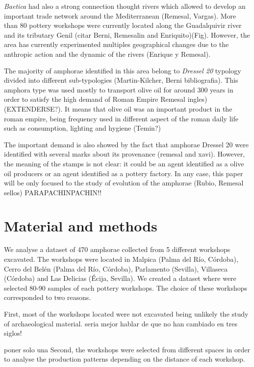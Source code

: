 \documentclass[review, twocolumn]{elsarticle}
\begin{document}
\emph{Baetica} had also a strong connection thought rivers which allowed to develop an important trade network around the Mediterranean (Remesal, Vargas). More than 80 pottery workshops were currently located along the Guadalquivir river and its tributary Genil (citar Berni, Remesalin and Enriquito)(Fig). However, the area has currently experimented multiples geographical changes due to the anthropic action and the dynamic of the rivers (Enrique y Remesal). 

The majority of amphorae identified in this area belong to \emph{Dressel 20} typology divided into different sub-typologies (Martin-Kilcher, Berni bibliografia). This amphora type was used mostly to transport olive oil for around 300 years in order to satisfy the high demand of Roman Empire Remesal ingles) (EXTENDERSE?). 
It means that olive oil was an important product in the roman empire, being frequency used in different aspect of the roman daily life such as consumption, lighting and hygiene (Temin?)

The important demand is also showed by the fact that amphorae Dressel 20 were identified with several marks about its provenance (remesal and xavi). However, the meaning of the stamps is not clear: it could be an agent identified as a olive oil producers or an agent identified as a pottery factory. In any case, this paper will be only focused to the study of evolution of the amphorae (Rubio, Remesal sellos) PARAPACHINPACHIN!!


\section{Material and methods}

We analyse a dataset of 470 amphorae collected from 5 different workshops excavated. 
The workshops were located in Malpica (Palma del R\'io, C\'ordoba), Cerro del Bel\'en (Palma del R\'io, C\'ordoba), Parlamento (Sevilla), Villaseca (C\'ordoba) and Las Delicias (\'Ecija, Sevilla). We created a dataset where were selected 80-90 samples of each pottery workshops. The choice of these workshops corresponded to two reasons. 


First, most of the workshops located were not excavated being unlikely the study of archaeological material. seria mejor hablar de que no han cambiado en tres siglos! 

poner solo una 
Second, the workshops were selected from different spaces in order to analyse the production patterns depending on the distance of each workshop. 
\end{document}
